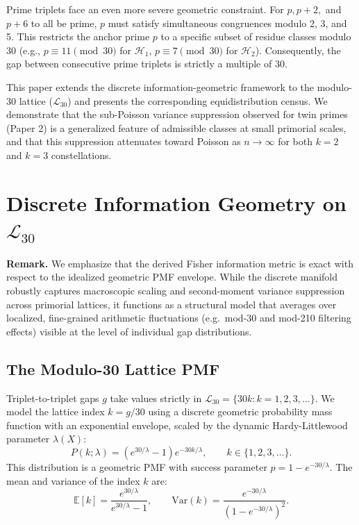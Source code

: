 \documentclass[11pt]{article}
\begin{document}
Prime triplets face an even more severe geometric constraint. For $p, p+2,$ and $p+6$ to all be prime, $p$ must satisfy simultaneous congruences modulo 2, 3, and 5. This restricts the anchor prime $p$ to a specific subset of residue classes modulo 30 (e.g., $p \equiv 11 \pmod{30}$ for $\mathcal{H}_1$, $p \equiv 7 \pmod{30}$ for $\mathcal{H}_2$). Consequently, the gap between consecutive prime triplets is strictly a multiple of 30.

This paper extends the discrete information-geometric framework to the modulo-30 lattice ($\mathcal{L}_{30}$) and presents the corresponding equidistribution census. We demonstrate that the sub-Poisson variance suppression observed for twin primes (Paper 2) is a generalized feature of admissible classes at small primorial scales, and that this suppression attenuates toward Poisson as $n \to \infty$ for both $k=2$ and $k=3$ constellations.

\section{Discrete Information Geometry on $\mathcal{L}_{30}$}

\noindent\textbf{Remark.} We emphasize that the derived Fisher information metric is exact with respect to the idealized geometric PMF envelope. While the discrete manifold robustly captures macroscopic scaling and second-moment variance suppression across primorial lattices, it functions as a structural model that averages over localized, fine-grained arithmetic fluctuations (e.g.\ mod-30 and mod-210 filtering effects) visible at the level of individual gap distributions.

\subsection{The Modulo-30 Lattice PMF}

Triplet-to-triplet gaps $g$ take values strictly in $\mathcal{L}_{30} = \{30k : k = 1, 2, 3, \ldots\}$. We model the lattice index $k = g/30$ using a discrete geometric probability mass function with an exponential envelope, scaled by the dynamic Hardy-Littlewood parameter $\lambda(X)$:
\begin{equation}
    P(k; \lambda) = \left(e^{30/\lambda} - 1\right) e^{-30k/\lambda}, \qquad k \in \{1, 2, 3, \ldots\}.
\end{equation}
This distribution is a geometric PMF with success parameter $p = 1 - e^{-30/\lambda}$. The mean and variance of the index $k$ are:
\begin{equation}
    \mathbb{E}[k] = \frac{e^{30/\lambda}}{e^{30/\lambda} - 1}, \qquad \text{Var}(k) = \frac{e^{-30/\lambda}}{(1 - e^{-30/\lambda})^2}.
\end{equation}
\end{document}
